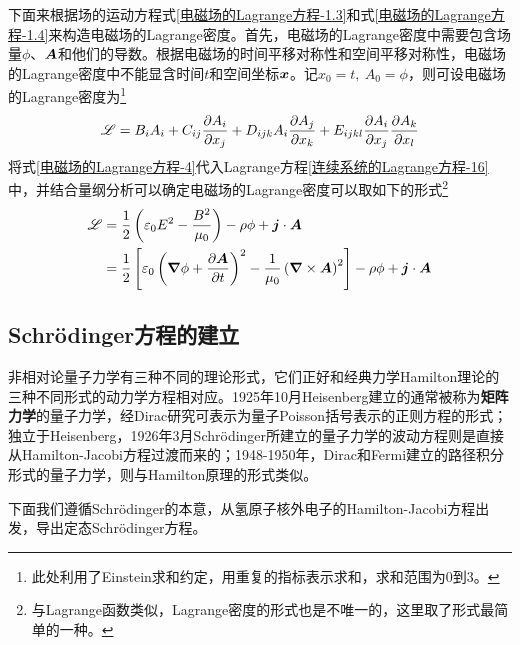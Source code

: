 下面来根据场的运动方程式\eqref{电磁场的Lagrange方程-1.3}和式\eqref{电磁场的Lagrange方程-1.4}来构造电磁场的Lagrange密度。首先，电磁场的Lagrange密度中需要包含场量$\phi$、$\boldsymbol{A}$和他们的导数。根据电磁场的时间平移对称性和空间平移对称性，电磁场的Lagrange密度中不能显含时间$t$和空间坐标$\boldsymbol{x}$。记$x_0 = t,~A_0 = \phi$，则可设电磁场的Lagrange密度为\footnote{此处利用了Einstein求和约定，用重复的指标表示求和，求和范围为$0$到$3$。}
\begin{equation}
	\mathscr{L} = B_iA_i+ C_{ij}\frac{\partial A_i}{\partial x_j} + D_{ijk}A_i\frac{\partial A_j}{\partial x_k} + E_{ijkl} \frac{\partial A_i}{\partial x_j}\frac{\partial A_k}{\partial x_l}
	\label{电磁场的Lagrange方程-4}
\end{equation}
将式\eqref{电磁场的Lagrange方程-4}代入Lagrange方程\eqref{连续系统的Lagrange方程-16}中，并结合量纲分析可以确定电磁场的Lagrange密度可以取如下的形式\footnote{与Lagrange函数类似，Lagrange密度的形式也是不唯一的，这里取了形式最简单的一种。}
\begin{align}
	\mathscr{L} & = \frac12 \left(\varepsilon_0E^2-\frac{B^2}{\mu_0}\right) - \rho \phi + \boldsymbol{j}\cdot \boldsymbol{A} \nonumber \\
	& = \frac12 \left[\varepsilon_0\left(\boldsymbol{\nabla}\phi+\frac{\partial \boldsymbol{A}}{\partial t}\right)^2-\frac{1}{\mu_0}\left(\boldsymbol{\nabla} \times \boldsymbol{A}\right)^2\right] - \rho \phi + \boldsymbol{j}\cdot \boldsymbol{A}
	\label{电磁场的Lagrange方程-5}
\end{align}

\subsection{Schr\"{o}dinger方程的建立}

非相对论量子力学有三种不同的理论形式，它们正好和经典力学Hamilton理论的三种不同形式的动力学方程相对应。1925年10月Heisenberg建立的通常被称为{\bf 矩阵力学}的量子力学，经Dirac研究可表示为量子Poisson括号表示的正则方程的形式；独立于Heisenberg，1926年3月Schr\"{o}dinger所建立的量子力学的波动方程则是直接从Hamilton-Jacobi方程过渡而来的；1948-1950年，Dirac和Fermi建立的路径积分形式的量子力学，则与Hamilton原理的形式类似。

下面我们遵循Schr\"{o}dinger的本意，从氢原子核外电子的Hamilton-Jacobi方程出发，导出定态Schr\"{o}dinger方程。

